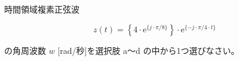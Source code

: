 時間領域複素正弦波

\[
z(t) =  \left \{ 4 \cdot \textrm{e}^{\{j \cdot \pi/8 \}} \right \} \cdot \textrm{e}^{\{ -j \cdot \pi/4 \cdot t \}}
\]

\bigskip
\noindent の角周波数 $w$ [rad/秒]を選択肢 a〜d の中から1つ選びなさい。

